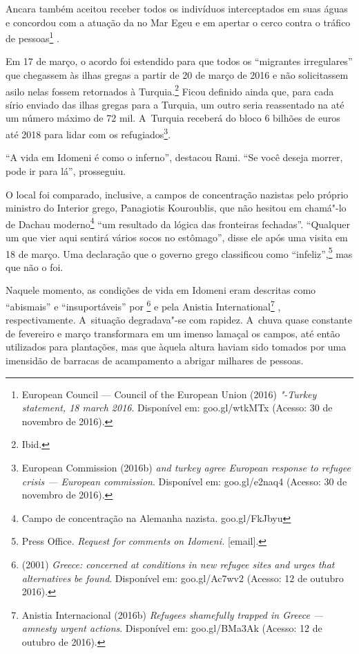 Ancara também aceitou receber todos os indivíduos interceptados em suas águas e concordou com a
atuação da  no Mar Egeu e em apertar o cerco contra o tráfico de
pessoas\footnote{ European Council --- Council of the European Union
(2016) \emph{"-Turkey statement, 18 march 2016}. Disponível em:
goo.gl/wtkMTx
(Acesso: 30 de novembro de 2016).} .

% 
% 
Em 17 de março, o acordo foi estendido para que todos os ``migrantes
irregulares'' que chegassem às ilhas gregas a partir de 20 de março de
2016 e não solicitassem asilo nelas fossem retornados à
Turquia.\footnote{ Ibid.}  Ficou definido ainda que, para cada sírio
enviado das ilhas gregas para a Turquia, um outro seria reassentado na
 até um número máximo de 72 mil. A~Turquia receberá do bloco 6 bilhões
de euros até 2018 para lidar com os refugiados\footnote{ European Commission (2016b) \emph{ and turkey agree
European response to refugee crisis --- European commission}. Disponível
em: goo.gl/e2naq4
(Acesso: 30 de
novembro de 2016).}.

``A vida em Idomeni é como o inferno'', destacou Rami. ``Se você deseja
morrer, pode ir para lá'', prosseguiu.

O local foi comparado, inclusive, a campos de concentração nazistas pelo próprio
ministro do Interior grego, Panagiotis Kouroublis, que não hesitou em
chamá"-lo de Dachau moderno\footnote{ Campo de concentração na Alemanha nazista.  goo.gl/FkJbyu }
 ``um resultado da
lógica das fronteiras fechadas''. ``Qualquer um que vier aqui sentirá
vários socos no estômago'', disse ele após uma visita em 18 de março.
Uma declaração que o governo grego classificou como
``infeliz'',\footnote{ Press Office. \emph{Request for comments on
Idomeni}\emph{.} {[}email{]}.} mas que não o foi.

Naquele momento, as condições de vida em Idomeni eram descritas como
``abismais'' e ``insuportáveis'' por \footnote{  (2001) \emph{Greece:  concerned at
conditions in new refugee sites and urges that alternatives be found}.
Disponível em:
goo.gl/Ac7wv2
(Acesso: 12 de outubro 2016).}  e
pela  Anistia International\footnote{ Anistia Internacional (2016b) \emph{Refugees
shamefully trapped in Greece --- amnesty urgent actions}. Disponível em:
goo.gl/BMa3Ak
(Acesso: 12 de outubro de 2016).} ,
respectivamente. A~situação degradava"-se com rapidez. A~chuva quase
constante de fevereiro e março transformara em um imenso lamaçal os
campos, até então utilizados para plantações, mas que àquela altura
haviam sido tomados por uma imensidão de barracas de acampamento a
abrigar milhares de pessoas. 

